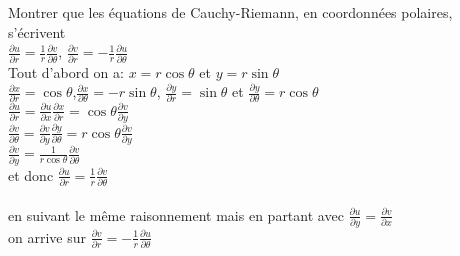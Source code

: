 \begin{myExample}
	Montrer que les équations de Cauchy-Riemann, en coordonnées polaires, s'écrivent
	\\
	$\frac{\partial u}{\partial r}=\frac{1}{r} \frac{\partial v}{\partial \theta}$, 
	$\frac{\partial v}{\partial r}=-\frac{1}{r} \frac{\partial u}{\partial \theta}$
	\\
	Tout d'abord on a:
	$x=r\cos \theta$ et $y=r\sin \theta$
	\\
	$\frac{\partial x}{\partial r}=\cos \theta$,$\frac{\partial x}{\partial \theta}=-r\sin \theta$,
	$\frac{\partial y}{\partial r}=\sin \theta$ et $\frac{\partial y}{\partial \theta}=r\cos \theta$ 
	\\
	$\frac{\partial u}{\partial r}=\frac{\partial u}{\partial x}\frac{\partial x}{\partial r}=\cos \theta \frac{\partial v}{\partial y}$
	\\
	$\frac{\partial v}{\partial \theta}=\frac{\partial v}{\partial y}\frac{\partial y}{\partial \theta}=r\cos \theta \frac{\partial v}{\partial y}$
	\\
	$\frac{\partial v}{\partial y}	= \frac{1}{r\cos \theta}\frac{\partial v}{\partial \theta}$
	\\et donc $\frac{\partial u}{\partial r}= \frac{1}{r}\frac{\partial v}{\partial \theta}$
	\\
	\\en suivant le même raisonnement mais en partant avec $\frac{\partial u}{\partial y}=\frac{\partial v}{\partial x}$
	\\on arrive sur $\frac{\partial v}{\partial r}=-\frac{1}{r} \frac{\partial u}{\partial \theta}$
	
\end{myExample}

